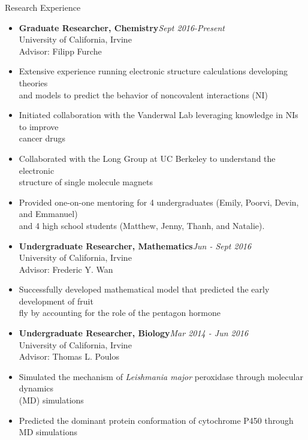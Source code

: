 \documentclass{resume} %
\begin{document}
\begin{rSection}{Research Experience}

\begin{itemize}    
\itemsep-0.65em
\item[] \textbf{Graduate Researcher, Chemistry}\hfill {\em Sept 2016-Present}\\
  University of California, Irvine\\
  Advisor: Filipp Furche
\item Extensive experience running electronic structure calculations developing theories \\
  and models to predict the behavior of noncovalent interactions (NI)
\item Initiated collaboration with the Vanderwal Lab leveraging knowledge in NIs to improve\\
  cancer drugs
\item Collaborated with the Long Group at UC Berkeley to understand the electronic \\
  structure of single molecule magnets
\item Provided one-on-one mentoring for 4 undergraduates (Emily, Poorvi, Devin, and Emmanuel)\\
  and 4 high school students (Matthew, Jenny, Thanh, and Natalie).\\

\item[] \textbf{Undergraduate Researcher, Mathematics}\hfill {\em Jun - Sept 2016}\\
  University of California, Irvine \\
  Advisor: Frederic Y. Wan
\item Successfully developed mathematical model that predicted the early development of fruit \\
  fly by accounting for the role of the pentagon hormone\\
  
\item[] \textbf{Undergraduate Researcher, Biology}\hfill {\em Mar 2014 - Jun 2016}\\
  University of California, Irvine \\
  Advisor: Thomas L. Poulos
\item Simulated the mechanism of \textit{Leishmania major} peroxidase through
  molecular dynamics\\
  (MD) simulations
\item Predicted the dominant protein conformation of cytochrome P450 through
  MD simulations\\


\end{itemize}
\end{rSection}
\end{document}
